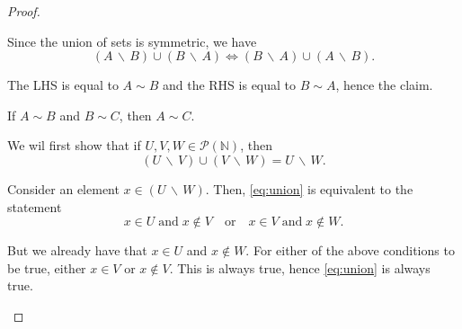 \begin{enumerate}
\begin{enumerate}
\begin{proof}
                    \medskip

                    \begin{subproof}
                        Since the union of sets is symmetric, we have
                        \[ (A \, \backslash \, B) \cup (B \, \backslash \, A) \Longleftrightarrow (B \, \backslash \, A) \cup (A \, \backslash \, B). \]

                        The LHS is equal to $A \sim B$ and the RHS is equal to $B \sim A$, hence the claim.
                    \end{subproof}

                    \medskip

                    \begin{claim}
                        If $A \sim B$ and $B \sim C$, then $A \sim C$.
                    \end{claim}

                    \begin{subproof}
                        We wil first show that if $U, V, W \in \mathcal{P}(\mathbb{N})$, then
                        \begin{equation} \label{eq:union}
                            (U \, \backslash \, V) \cup (V \, \backslash \, W) = U \, \backslash \, W.
                        \end{equation}

                        Consider an element $x \in (U \, \backslash \, W)$.
                        Then, \cref{eq:union} is equivalent to the statement
                        \[ x \in U \; \text{and} \; x \notin V \quad \text{or} \quad x \in V \; \text{and} \; x \notin W. \]

                        But we already have that $x \in U$ and $x \notin W$.
                        For either of the above conditions to be true, either $x \in V$ or $x \notin V$.
                        This is always true, hence \cref{eq:union} is always true.


\end{subproof}
\end{proof}
\end{enumerate}
\end{enumerate}
